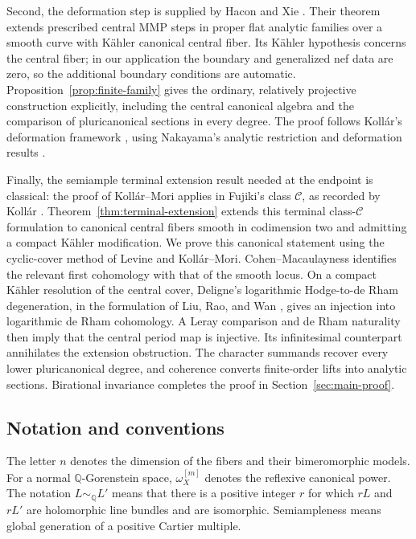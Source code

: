 \documentclass[11pt,a4paper]{article}
\theoremstyle{definition}\newtheorem{definition}[theorem]{Definition}
\theoremstyle{remark}\newtheorem*{remark}{Remark}
\newcommand{\Q}{\mathbb Q}\newcommand{\C}{\mathbb C}
\begin{document}
Second, the deformation step is supplied by Hacon and Xie
\cite[Theorem~7.7]{HX2026}. Their theorem extends prescribed central
MMP steps in proper flat analytic families over a smooth curve with Kähler canonical
central fiber. Its Kähler hypothesis concerns the central fiber;
in our application the boundary and generalized nef data are zero,
so the additional boundary conditions are automatic.
Proposition~\ref{prop:finite-family} gives the ordinary, relatively
projective construction explicitly, including the central canonical
algebra and the comparison of pluricanonical sections in every degree.
The proof follows Kollár's deformation framework
\cite[paragraph~8]{Kollar2021}, using Nakayama's analytic restriction
and deformation results \cite[VI.3.8 and VI.5.2]{Nakayama2004}.

Finally, the semiample terminal extension result needed at the endpoint
is classical: the proof of Kollár--Mori
\cite[Theorem~12.5.5]{KM1992} applies in Fujiki's class $\mathcal C$,
as recorded by Kollár \cite[comments following Conjecture~17]{Kollar2021}.
Theorem~\ref{thm:terminal-extension} extends this terminal
class-$\mathcal C$ formulation to canonical central fibers smooth in
codimension two and admitting a compact Kähler modification.
We prove this canonical statement using the cyclic-cover method of Levine
\cite[Proposition~1.6 and Corollaries~1.8 and~1.10]{Levine1983}
and Kollár--Mori. Cohen--Macaulayness identifies the relevant first
cohomology with that of the smooth locus.
On a compact Kähler resolution of the central cover, Deligne's
logarithmic Hodge-to-de Rham degeneration, in the formulation of
Liu, Rao, and Wan \cite[Theorem~3.2]{LRW2019}, gives an injection
into logarithmic de Rham cohomology. A Leray comparison and de Rham
naturality then imply that the central period map is injective.
Its infinitesimal counterpart annihilates the extension obstruction.
The character summands recover every lower pluricanonical degree, and
coherence converts finite-order lifts into analytic sections.
Birational invariance completes the proof in
Section~\ref{sec:main-proof}.

\subsection{Notation and conventions}

The letter $n$ denotes the dimension of the fibers and their
bimeromorphic models.
For a normal $\Q$-Gorenstein space, $\omega_X^{[m]}$ denotes the reflexive
canonical power. The notation $L\sim_\Q L'$ means that there is a positive
integer $r$ for which $rL$ and $rL'$ are holomorphic line bundles and are
isomorphic.
Semiampleness means global generation of a positive Cartier multiple.
\end{document}
